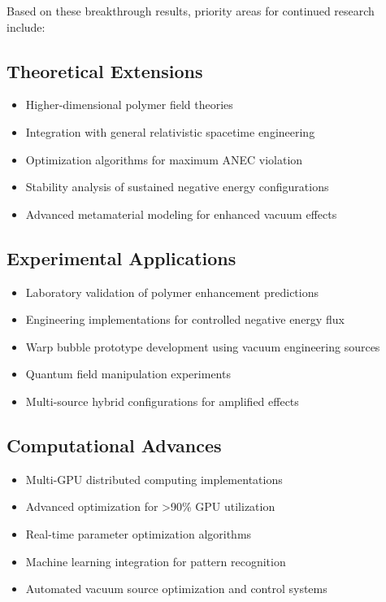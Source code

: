 \documentclass[11pt]{article}
\begin{document}
Based on these breakthrough results, priority areas for continued research include:

\subsection{Theoretical Extensions}
\begin{itemize}
    \item Higher-dimensional polymer field theories
    \item Integration with general relativistic spacetime engineering
    \item Optimization algorithms for maximum ANEC violation
    \item Stability analysis of sustained negative energy configurations
    \item Advanced metamaterial modeling for enhanced vacuum effects
\end{itemize}

\subsection{Experimental Applications}
\begin{itemize}
    \item Laboratory validation of polymer enhancement predictions
    \item Engineering implementations for controlled negative energy flux
    \item Warp bubble prototype development using vacuum engineering sources
    \item Quantum field manipulation experiments
    \item Multi-source hybrid configurations for amplified effects
\end{itemize}

\subsection{Computational Advances}
\begin{itemize}
    \item Multi-GPU distributed computing implementations
    \item Advanced optimization for >90\% GPU utilization
    \item Real-time parameter optimization algorithms
    \item Machine learning integration for pattern recognition
    \item Automated vacuum source optimization and control systems
\end{itemize}
\end{document}
